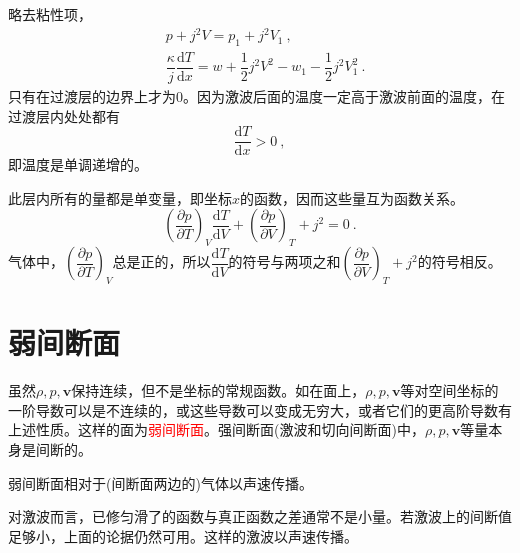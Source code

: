 \documentclass[12pt,a4paper]{article}
\renewcommand{\vec}[1]{\boldsymbol{#1}}
\newcommand{\dif}{\mathrm{d}}
\begin{document}
略去粘性项，
\begin{align}
& p +j^2 V = p_1 + j^2 V_1 ~, \\
& \dfrac{\kappa}{j} \dfrac{\dif T}{\dif x} = w +\dfrac{1}{2} j^2 V^2 - w_1 -\dfrac{1}{2} j^2 V_1^2 ~.
\end{align}
只有在过渡层的边界上才为$0$。因为激波后面的温度一定高于激波前面的温度，在过渡层内处处都有
\begin{equation}
\dfrac{\dif T}{\dif x} > 0 ~,
\end{equation}
即温度是单调递增的。

此层内所有的量都是单变量，即坐标$x$的函数，因而这些量互为函数关系。
\begin{equation*}
\left(\dfrac{\partial p}{\partial T}\right)_V \dfrac{\dif T}{\dif V} + \left(\dfrac{\partial p}{\partial V}\right)_T + j^2 = 0 ~.
\end{equation*}
气体中，$\left(\dfrac{\partial p}{\partial T}\right)_V$总是正的，所以$\dfrac{\dif T}{\dif V}$的符号与两项之和$\left(\dfrac{\partial p}{\partial V}\right)_T + j^2$的符号相反。



















\section{弱间断面}
虽然$\rho, p, \vec{v}$保持连续，但不是坐标的常规函数。如在面上，$\rho, p, \vec{v}$等对空间坐标的一阶导数可以是不连续的，或这些导数可以变成无穷大，或者它们的更高阶导数有上述性质。这样的面为\textcolor{red}{弱间断面}。强间断面(激波和切向间断面)中，$\rho, p, \vec{v}$等量本身是间断的。

弱间断面相对于(间断面两边的)气体以声速传播。

对激波而言，已修匀滑了的函数与真正函数之差通常不是小量。若激波上的间断值足够小，上面的论据仍然可用。这样的激波以声速传播。
\end{document}
